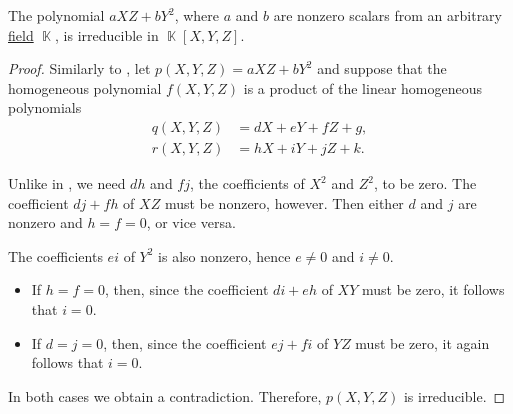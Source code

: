 \begin{proposition}\label{thm:axz_byy_irreducible}
  The polynomial \( a XZ + b Y^2 \), where \( a \) and \( b \) are nonzero scalars from an arbitrary \hyperref[def:field]{field} \( \BbbK \), is irreducible in \( \BbbK[X, Y, Z] \).
\end{proposition}
\begin{proof}
  Similarly to , let \( p(X, Y, Z) = a XZ + b Y^2 \) and suppose that the homogeneous polynomial \( f(X, Y, Z) \) is a product of the linear homogeneous polynomials
  \begin{align*}
    q(X, Y, Z) &= d X + e Y + f Z + g, \\
    r(X, Y, Z) &= h X + i Y + j Z + k.
  \end{align*}

  Unlike in , we need \( dh \) and \( fj \), the coefficients of \( X^2 \) and \( Z^2 \), to be zero. The coefficient \( dj + fh \) of \( XZ \) must be nonzero, however. Then either \( d \) and \( j \) are nonzero and \( h = f = 0 \), or vice versa.

  The coefficients \( ei \) of \( Y^2 \) is also nonzero, hence \( e \neq 0 \) and \( i \neq 0 \).

  \begin{itemize}
    \item If \( h = f = 0 \), then, since the coefficient \( di + eh \) of \( XY \) must be zero, it follows that \( i = 0 \).

    \item If \( d = j = 0 \), then, since the coefficient \( ej + fi \) of \( YZ \) must be zero, it again follows that \( i = 0 \).
  \end{itemize}

  In both cases we obtain a contradiction. Therefore, \( p(X, Y, Z) \) is irreducible.
\end{proof}
